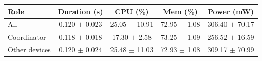 \begin{tabular}{lcccc}
\hline
\textbf{Role} & \textbf{Duration (s)} & \textbf{CPU (\%)} & \textbf{Mem (\%)} & \textbf{Power (mW)} \\
\hline
All & 0.120 $\pm$ 0.023 & 25.05 $\pm$ 10.91 & 72.95 $\pm$ 1.08 & 306.40 $\pm$ 70.17 \\
Coordinator & 0.118 $\pm$ 0.018 & 17.30 $\pm$ 2.58 & 73.25 $\pm$ 1.09 & 256.52 $\pm$ 16.59 \\
Other devices & 0.120 $\pm$ 0.024 & 25.48 $\pm$ 11.03 & 72.93 $\pm$ 1.08 & 309.17 $\pm$ 70.99 \\
\hline
\end{tabular}
